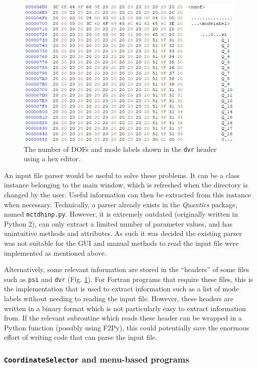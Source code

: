 \documentclass[12pt]{article}
\begin{document}
\begin{figure}
\includegraphics[width=\linewidth]{img/header_info.png} 
\caption{The number of DOFs and mode labels shown in the \texttt{dvr} header using a hex editor.}
\label{fig:header_info}
\end{figure}

An input file parser would be useful to solve these problems. It can be a class instance belonging to the main window, which is refreshed when the directory is changed by the user. Useful information can then be extracted from this instance when necessary. Technically, a parser already exists in the \textit{Quantics} package, named \texttt{mctdhinp.py}. However, it is extremely outdated (originally written in Python 2), can only extract a limited number of parameter values, and has unintuitive methods and attributes. As such it was decided the existing parser was not suitable for the GUI and manual methods to read the input file were implemented as mentioned above.

Alternatively, some relevant information are stored in the ``headers'' of some files such as \texttt{psi} and \texttt{dvr} (Fig. \ref{fig:header_info}). For Fortran programs that require these files, this is the implementation that is used to extract information such as a list of mode labels without needing to reading the input file. However, these headers are written in a binary format which is not particularly easy to extract information from. If the relevant subroutine which reads these header can be wrapped in a Python function (possibly using F2Py), this could potentially save the enormous effort of writing code that can parse the input file.

\subsubsection{\texttt{CoordinateSelector} and menu-based programs}
\end{document}
